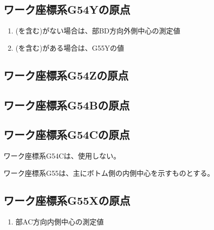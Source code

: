 \subsection{ワーク座標系{\ttfamily G54Y}の原点}
\begin{enumerate}[label*=\sarrow]
\item \BottomOutcut(\BottomCurvedOutcut を含む)がない場合は、\BottomEndFace 部BD方向外側中心の測定値
\item \BottomOutcut(\BottomCurvedOutcut を含む)がある場合は、{\ttfamily G55Y}の値
\end{enumerate}


\subsection{ワーク座標系{\ttfamily G54Z}の原点\TBW}


\subsection{ワーク座標系{\ttfamily G54B}の原点\TBW}


\subsection{ワーク座標系{\ttfamily G54C}の原点}
ワーク座標系{\ttfamily G54C}は、使用しない。



\clearpage
ワーク座標系{\ttfamily G55}は、主にボトム側の内側中心を示すものとする。


\subsection{ワーク座標系{\ttfamily G55X}の原点}
\begin{enumerate}[label*=\sarrow]
\item \BottomEndFace 部AC方向内側中心の測定値
\end{enumerate}


